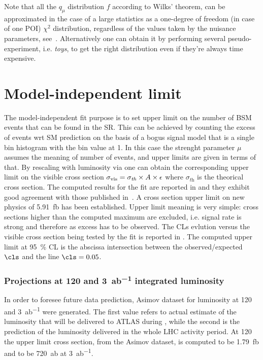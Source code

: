 Note that all the $q_\mu$ distribution $f$ according to Wilks' theorem, can be approximated in the case of a large statistics as a one-degree of freedom (in case of one POI) $\chi^2$ distribution, regardless of the values taken by the nuisance parameters, see~\cite[\!]{Cowan}. Alternatively one can obtain it by performing several pseudo-experiment, i.e. \emph{toys}, to get the right distribution even if they're always time expensive.

\section{Model-independent limit}
The model-independent fit purpose is to set upper limit on the number of BSM events that can be found in the SR. This can be achieved by counting the excess of events wrt SM prediction on the basis of a bogus signal model that is a single bin histogram with the bin value at 1. In this case the strenght parameter $\mu$ assumes the meaning of number of events, and upper limits are given in terms of that. By rescaling with luminosity via \Eqn{\ref{eqn:Nevents}} one can obtain the corresponding upper limit on the visible cross section $\sigma_\textup{vis}=\sigma_\textit{th}\times A\times\epsilon$ where $\sigma_\textit{th}$ is the theorical cross section. The computed results for the fit are reported in \Tab{\ref{table.results.exclxsec.pval.upperlimit.SR}} and they exhibit good agreement with those published in~\cite{paperMP}. A cross section upper limit on new physics of \SI{5.91}{fb} has been established. Upper limit meaning is very simple: cross sections higher than the computed maximum are excluded, i.e. signal rate is strong and therefore as excess has to be observed. The CLs evlution versus the visible cross section being tested by the fit is reported in \Fig{\ref{fig:cls}}. The computed upper limit at \SI{95}{\percent} CL is the abscissa intersection between the observed/expected $\cls$ and the line $\cls=0.05$.




\subsubsection{Projections at \SI{120}{\ifb} and \SI{3}{ab^{-1}} integrated luminosity}
 In order to foresee future data prediction, Asimov dataset for luminosity at \SI{120}{\ifb} and \SI{3}{ab^{-1}} were generated. The first value refers to actual estimate of the luminosity that will be delivered to ATLAS during \RunTwo, while the second is the prediction of the luminosity delivered in the whole LHC activity period. At \SI{120}{\ifb} the upper limit cross section, from the Asimov dataset, is computed to be \SI{1.79}{fb} and to be \SI{720}{ab} at \SI{3}{ab^{-1}}.



